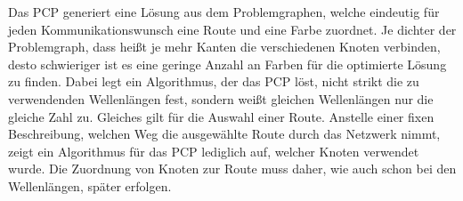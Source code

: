 Das PCP generiert eine Lösung aus dem Problemgraphen, welche eindeutig für jeden Kommunikationswunsch eine Route und eine Farbe zuordnet. Je dichter der Problemgraph, dass heißt
je mehr Kanten die verschiedenen Knoten verbinden, desto schwieriger ist es eine geringe Anzahl an Farben für die optimierte Lösung zu finden. Dabei legt ein Algorithmus, der das
PCP löst, nicht strikt die zu verwendenden Wellenlängen fest, sondern weißt gleichen Wellenlängen nur die gleiche Zahl zu. Gleiches gilt für die Auswahl einer Route. Anstelle
einer fixen Beschreibung, welchen Weg die ausgewählte Route durch das Netzwerk nimmt, zeigt ein Algorithmus für das PCP lediglich auf, welcher Knoten verwendet wurde. 
Die Zuordnung von Knoten zur Route muss daher, wie auch schon bei den Wellenlängen, später erfolgen.

